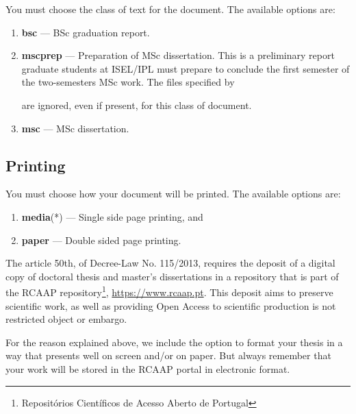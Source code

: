 You must choose the class of text for the document. The available options are:

\begin{enumerate}
	\item \textbf{bsc} --- BSc graduation report.
	\item \textbf{mscprep} --- Preparation of MSc dissertation. This is a preliminary report graduate students at ISEL/IPL must prepare to conclude the first semester of the two-semesters MSc work. The files specified by 
	are ignored, even if present, for this class of document.
	\item \textbf{msc} --- MSc dissertation.
\end{enumerate}
%
\subsection{Printing} %
\label{sub:printing}

You must choose how your document will be printed. The available options are:

\begin{enumerate}
\item \textbf{media}(*) --- Single side page printing, and
\item \textbf{paper} --- Double sided page printing.
\end{enumerate}

The article 50th, of Decree-Law No. 115/2013, requires the deposit of a digital copy of doctoral thesis and master's dissertations in a repository that is part of the RCAAP  repository\footnote{Repositórios Científicos de Acesso Aberto de Portugal}, \url{https://www.rcaap.pt}.  This deposit aims to preserve scientific work, as well as providing Open Access to scientific production is not restricted object or embargo.

For the reason explained above, we include the option to format your thesis in a way that presents well on screen and/or on paper. But always remember that your work will be stored in the RCAAP portal in electronic format.


